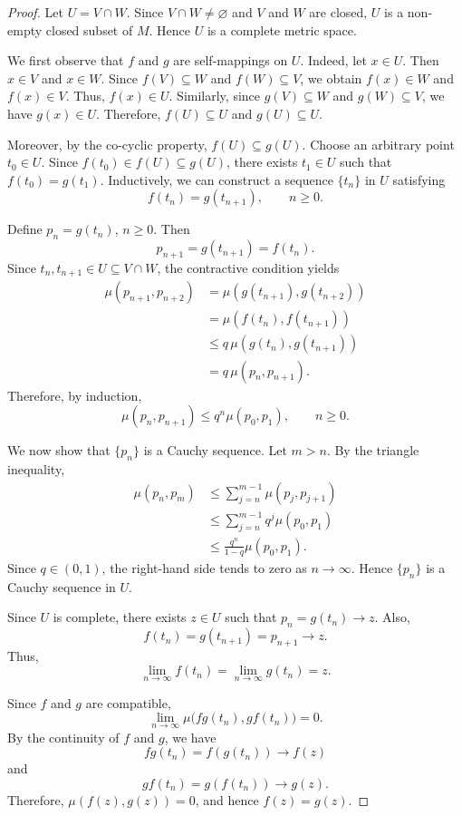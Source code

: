 \documentclass[11pt,a4paper,margin=1in]{amsart}
\theoremstyle{plain}
\theoremstyle{definition}
\theoremstyle{remark}
\begin{document}
\begin{proof}
Let $U=V\cap W$. Since $V\cap W\neq\varnothing$ and $V$ and $W$ are closed, $U$ is a
non-empty closed subset of $M$. Hence $U$ is a complete metric space.

We first observe that $f$ and $g$ are self-mappings on $U$. Indeed, let
$x\in U$. Then $x\in V$ and $x\in W$. Since $f(V)\subseteq W$ and $f(W)\subseteq V$, we obtain $f(x)\in W$ and $f(x)\in V$. Thus, $f(x)\in U$. 
Similarly, since $g(V)\subseteq W$ and $g(W)\subseteq V$, we have $g(x)\in U$. Therefore, $f(U)\subseteq U$ and $g(U)\subseteq U$. 

Moreover, by the co-cyclic property, $f(U)\subseteq g(U)$. Choose an arbitrary point $t_0\in U$. Since $f(t_0)\in f(U)\subseteq
g(U)$, there exists $t_1\in U$ such that $f(t_0)=g(t_1)$. Inductively, we can construct a sequence $\{t_n\}$ in $U$ satisfying
\[
f(t_n)=g(t_{n+1}),\qquad n\geq0.
\]

Define $p_n=g(t_n)$, $n\geq0$. Then
\[
p_{n+1}=g(t_{n+1})=f(t_n).
\]
Since $t_n,t_{n+1}\in U\subseteq V\cap W$, the contractive condition
yields
\[
\begin{aligned}
\mu(p_{n+1},p_{n+2})
&=\mu(g(t_{n+1}),g(t_{n+2}))\\
&=\mu(f(t_n),f(t_{n+1}))\\
&\leq q\,\mu(g(t_n),g(t_{n+1}))\\
&=q\,\mu(p_n,p_{n+1}).
\end{aligned}
\]
Therefore, by induction,
\[
\mu(p_n,p_{n+1})
\leq
q^n\mu(p_0,p_1),
\qquad n\geq0.
\]

We now show that $\{p_n\}$ is a Cauchy sequence. Let $m>n$. By the
triangle inequality,
\[
\begin{aligned}
\mu(p_n,p_m)
&\leq
\sum_{j=n}^{m-1}\mu(p_j,p_{j+1})\\
&\leq
\sum_{j=n}^{m-1}q^j\mu(p_0,p_1)\\
&\leq
\frac{q^n}{1-q}\mu(p_0,p_1).
\end{aligned}
\]
Since $q\in(0,1)$, the right-hand side tends to zero as $n\to\infty$.
Hence $\{p_n\}$ is a Cauchy sequence in $U$.

Since $U$ is complete, there exists $z\in U$ such that $p_n=g(t_n)\longrightarrow z$. Also,
\[
f(t_n)=g(t_{n+1})=p_{n+1}\longrightarrow z.
\]
Thus,
\[
\lim_{n\to\infty}f(t_n)
=
\lim_{n\to\infty}g(t_n)
=
z.
\]

Since $f$ and $g$ are compatible,
\[
\lim_{n\to\infty}
\mu\bigl(fg(t_n),gf(t_n)\bigr)=0.
\]
By the continuity of $f$ and $g$, we have
\[
fg(t_n)=f(g(t_n))\longrightarrow f(z)
\]
and
\[
gf(t_n)=g(f(t_n))\longrightarrow g(z).
\]
Therefore, $\mu(f(z),g(z))=0$, 
and hence $f(z)=g(z)$. 


\end{proof}
\end{document}
